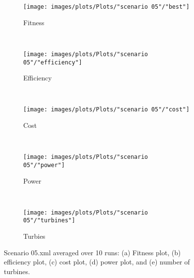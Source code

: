 \documentclass[12pt]{report}
\begin{document}
\begin{figure}[h!]
    \centering
      \begin{subfigure}[b]{0.31\textwidth}
        \texttt{[image: images/plots/Plots/"scenario 05"/"best"]}
        \caption{Fitness}
        \hfill
        \label{plot:fitness plot scenario 05}
    \end{subfigure}
    ~
      \begin{subfigure}[b]{0.31\textwidth}
        \texttt{[image: images/plots/Plots/"scenario 05"/"efficiency"]}
        \caption{Efficiency}
        \hfill
        \label{plot:single point crossover}
    \end{subfigure}
    ~
    \begin{subfigure}[b]{0.31\textwidth}
        \texttt{[image: images/plots/Plots/"scenario 05"/"cost"]}
        \caption{Cost}
        \hfill
        \label{plot:single point crossover}
    \end{subfigure}
    ~
    \begin{subfigure}[b]{0.31\textwidth}
        \texttt{[image: images/plots/Plots/"scenario 05"/"power"]}
        \caption{Power}
        \hfill
        \label{plot:two point crossover}
    \end{subfigure}
    ~
    \begin{subfigure}[b]{0.31\textwidth}
        \texttt{[image: images/plots/Plots/"scenario 05"/"turbines"]}
        \caption{Turbies}
        \hfill
        \label{plot:uniform crossover}
    \end{subfigure}
    \caption{Scenario 05.xml averaged over 10 runs: (a) Fitness plot, (b) efficiency plot, (c) cost plot, (d) power plot, and (e) number of turbines.}
    \label{plot:master slave scenario 05}
\end{figure}
\end{document}
